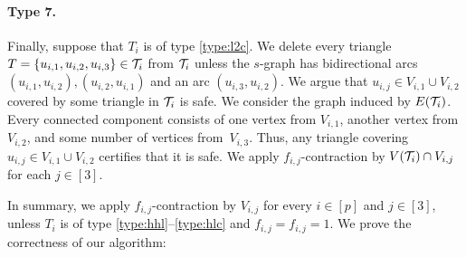 \paragraph{Type 7.}
Finally, suppose that $T_i$ is of type \ref{type:l2c}.
We delete every triangle $T = \{ u_{i,1}, u_{i,2}, u_{i,3} \} \in \mathcal T_i$ from $\mathcal T_i$ unless the $s$-graph has bidirectional arcs $(u_{i,1}, u_{i,2}), (u_{i,2}, u_{i,1})$ and an arc $(u_{i,3}, u_{i,2})$.
We argue that $u_{i,j}\in V_{i,1} \cup V_{i,2}$ covered by some triangle in $\mathcal T_i$ is safe.
We consider the graph induced by $E(\mathcal T_i)$.
Every connected component consists of one vertex from $V_{i,1}$, another vertex from $V_{i,2}$, and some number of vertices from~$V_{i,3}$.
Thus, any triangle covering $u_{i,j} \in V_{i,1} \cup V_{i,2}$ certifies that it is safe.
We apply $f_{i,j}$-contraction by $V(\mathcal T_i) \cap V_{i,j}$ for each $j \in [3]$.

\medskip

In summary, we apply $f_{i,j}$-contraction by $V_{i,j}$ for every $i \in [p]$ and $j \in [3]$, unless $T_i$ is of type \ref{type:hhl}--\ref{type:hlc} and $f_{i,j} = f_{i,j} = 1$.
We prove the correctness of our algorithm:



